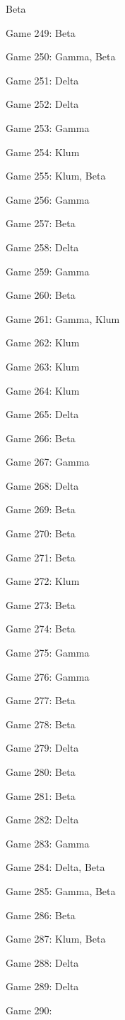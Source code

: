\documentclass{article}
\begin{document}
\begin{multicols}{3}
\begin{compactitem}
Beta
\item Game 249:
Beta
\item Game 250:
Gamma, Beta
\item Game 251:
Delta
\item Game 252:
Delta
\item Game 253:
Gamma
\item Game 254:
Klum
\item Game 255:
Klum, Beta
\item Game 256:
Gamma
\item Game 257:
Beta
\item Game 258:
Delta
\item Game 259:
Gamma
\item Game 260:
Beta
\item Game 261:
Gamma, Klum
\item Game 262:
Klum
\item Game 263:
Klum
\item Game 264:
Klum
\item Game 265:
Delta
\item Game 266:
Beta
\item Game 267:
Gamma
\item Game 268:
Delta
\item Game 269:
Beta
\item Game 270:
Beta
\item Game 271:
Beta
\item Game 272:
Klum
\item Game 273:
Beta
\item Game 274:
Beta
\item Game 275:
Gamma
\item Game 276:
Gamma
\item Game 277:
Beta
\item Game 278:
Beta
\item Game 279:
Delta
\item Game 280:
Beta
\item Game 281:
Beta
\item Game 282:
Delta
\item Game 283:
Gamma
\item Game 284:
Delta, Beta
\item Game 285:
Gamma, Beta
\item Game 286:
Beta
\item Game 287:
Klum, Beta
\item Game 288:
Delta
\item Game 289:
Delta
\item Game 290:

\end{compactitem}
\end{multicols}
\end{document}
